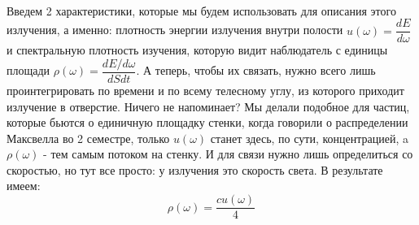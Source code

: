 \documentclass[12pt]{article}
\begin{document}
\\
Введем 2 характеристики, которые мы будем использовать для \vspace{1mm} описания этого излучения, а именно: плотность энергии излучения внутри полости \vspace{2mm} $u(\omega) = \dfrac{dE}{d\omega}$ и спектральную плотность изучения, которую видит наблюдатель с единицы площади \vspace{3mm}$\rho(\omega) = \dfrac{dE/d\omega}{dSdt}$. А теперь, чтобы их связать, нужно всего лишь проинтегрировать по времени и по всему телесному углу, из которого приходит излучение в отверстие. Ничего не напоминает? Мы делали подобное для частиц, которые бьются о единичную площадку стенки, когда говорили о распределении Максвелла во 2 семестре, только $u(\omega)$ станет здесь, по сути, концентрацией, a $\rho(\omega)$ - тем самым потоком на стенку. И для связи нужно лишь определиться со скоростью, но тут все просто: у излучения это скорость света. В результате имеем:\vspace{-1mm}
\begin{equation}
    \rho(\omega) = \dfrac{cu(\omega)}{4}
\end{equation}
\end{document}

